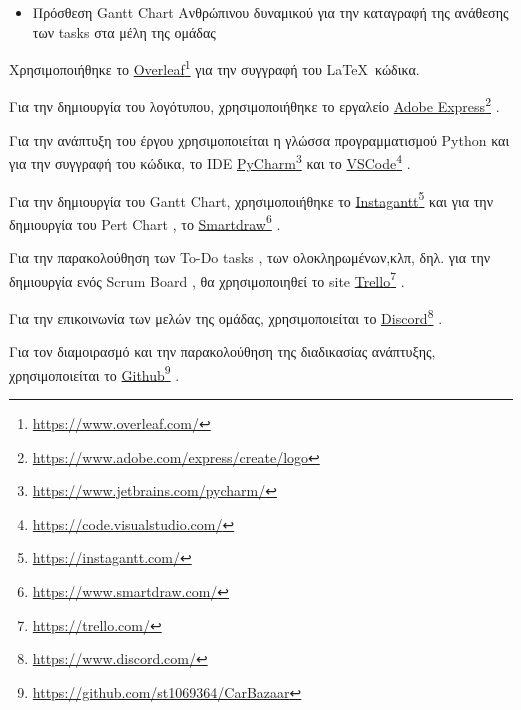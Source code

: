 \documentclass{../ol-softwaremanual}
\newcommand{\doclink}[2]{\href{#1}{#2}\footnote{\url{#1}}}
\begin{document}
	\vspace{10pt}
	
	\begin{itemize}
		\item Πρόσθεση \en Gantt Chart \gr Ανθρώπινου δυναμικού για την καταγραφή της ανάθεσης των  \en tasks \gr στα μέλη της ομάδας 
	\end{itemize}

	\vspace{20pt}
	
	
	\vspace{20pt}
	\flushleft
	Χρησιμοποιήθηκε το \en \doclink{https://www.overleaf.com/}{Overleaf} \gr για την συγγραφή του \LaTeX\ κώδικα. \break
	
	Για την δημιουργία του λογότυπου, χρησιμοποιήθηκε το εργαλείο \en \doclink{https://www.adobe.com/express/create/logo}{Adobe Express} . \gr \break
	
	Για την ανάπτυξη του έργου χρησιμοποιείται η γλώσσα προγραμματισμού \en Python \gr και για την συγγραφή του κώδικα, το \en IDE \doclink{https://www.jetbrains.com/pycharm/}{PyCharm} \gr και το \en \doclink{https://code.visualstudio.com/}{VSCode} \gr .         \\ \break
	
	Για την δημιουργία του \en Gantt Chart, \gr χρησιμοποιήθηκε το \en \doclink{https://instagantt.com/}{Instagantt} \gr και για την δημιουργία του \en Pert Chart \gr, το \en \doclink{https://www.smartdraw.com/}{Smartdraw} \gr. \break 
	
	Για την παρακολούθηση των \en To-Do tasks \gr, των ολοκληρωμένων,κλπ, δηλ. για την δημιουργία ενός \en Scrum Board \gr, θα χρησιμοποιηθεί το \en site \doclink{https://trello.com/}{Trello} \gr. \break 
	
	Για την επικοινωνία των μελών της ομάδας, χρησιμοποιείται το \en \doclink{ https://www.discord.com/}{Discord} \gr . \linebreak 
	
	
	Για τον διαμοιρασμό και την παρακολούθηση της διαδικασίας ανάπτυξης, χρησιμοποιείται το \en \doclink{https://github.com/st1069364/CarBazaar}{Github} \gr.
	
	
	
	\newpage
	
	\flushleft
	
	\vspace{20pt}
	
\end{document}
